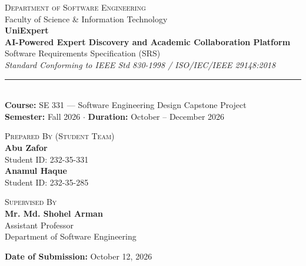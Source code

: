 \documentclass[11pt,a4paper]{article}
\begin{document}
\begin{titlepage}
    \centering
    \vspace*{1.2cm}
    
    {\large\scshape Department of Software Engineering}\\[0.2cm]
    {\normalsize Faculty of Science \& Information Technology}\\[2.2cm]
    
    {\Huge\bfseries\color{primary} UniExpert}\\[0.5cm]
    {\LARGE\bfseries\color{darkslate} AI-Powered Expert Discovery and Academic Collaboration Platform}\\[0.8cm]
    {\large\color{secondary} Software Requirements Specification (SRS)}\\[0.2cm]
    {\normalsize\textit{Standard Conforming to IEEE Std 830-1998 / ISO/IEC/IEEE 29148:2018}}\\[0.4cm]
    \rule{3.2in}{0.5pt}\\[0.6cm]
    
    {\normalsize\textbf{Course:} SE 331 --- Software Engineering Design Capstone Project}\\[0.25cm]
    {\normalsize\textbf{Semester:} Fall 2026 \quad $\cdot$ \quad \textbf{Duration:} October -- December 2026}\\[3.2cm]
    
    \begin{minipage}[t]{0.48\textwidth}
        \begin{flushleft}
            {\small\scshape Prepared By (Student Team)}\\[0.35cm]
            \textbf{Abu Zafor}\\
            {\small Student ID: 232-35-331}\\[0.25cm]
            \textbf{Anamul Haque}\\
            {\small Student ID: 232-35-285}
        \end{flushleft}
    \end{minipage}
    \hfill
    \begin{minipage}[t]{0.45\textwidth}
        \begin{flushright}
            {\small\scshape Supervised By}\\[0.35cm]
            \textbf{Mr. Md. Shohel Arman}\\[0.12cm]
            {\small Assistant Professor}\\
            {\small Department of Software Engineering}
        \end{flushright}
    \end{minipage}
    
    \vfill
    
    {\small\textbf{Date of Submission:} October 12, 2026}
    \vspace*{1.0cm}
\end{titlepage}
\end{document}
